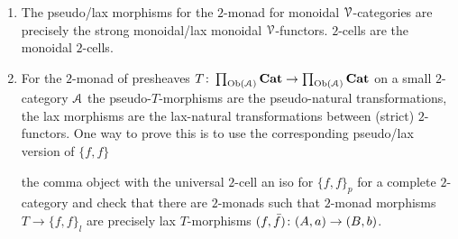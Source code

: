 \documentclass[a4paper,11pt,oneside,openany]{scrbook}
\begin{document}
\begin{exmp}
    \begin{enumerate}
        \item The pseudo/lax morphisms for the $2$-monad for monoidal $\operatorname{\mathcal{V}}$-categories are precisely the strong monoidal/lax monoidal $\operatorname{\mathcal{V}}$-functors. $2$-cells are the
	monoidal $2$-cells.
        \item For the $2$-monad of presheaves
    $T\colon\prod_{\operatorname{Ob}(\operatorname{\mathcal{A}})}{\normalfont\textbf{Cat}}\to\prod_{\operatorname{Ob}(\operatorname{\mathcal{A}})}{\normalfont\textbf{Cat}}$ on a small $2$-category
    $\operatorname{\mathcal{A}}$ the pseudo-$T$-morphisms are the pseudo-natural transformations, the
    lax morphisms are the lax-natural transformations between (strict)
    $2$-functors. One way to prove this is to use the corresponding pseudo/lax
    version of $\{f,f\}$
	\begin{center}
	\end{center}
	the comma object with the universal $2$-cell an iso for $\{f,f\}_{p}$ for a complete $2$-category and check that there are $2$-monads such that
	$2$-monad morphisms $T \to  \{f,f\}_{l}$ are precisely lax $T$-morphisms $(f,\bar{f}) \colon (A,a) \to (B,b)$.
    \end{enumerate}
\end{exmp}
\end{document}
